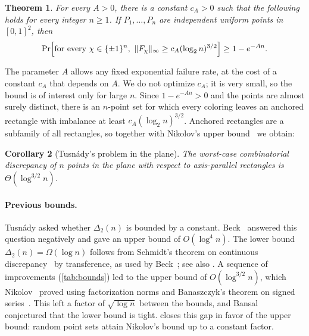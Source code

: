 \documentclass[11pt,letterpaper]{article}
\newtheorem{theorem}{Theorem}[section]
\newtheorem{corollary}[theorem]{Corollary}
\newcommand{\1}{\mathbf{1}}
\newcommand{\Fnorm}[1]{\lVert #1\rVert_\infty}
\newcommand{\pmone}{\{\pm1\}}
\begin{document}
\begin{theorem}\label{thm:main}
For every $A>0$, there is a constant $c_A>0$ such that the following holds for every integer $n\ge1$. If $P_1,\dots,P_n$ are independent uniform points in $[0,1]^2$, then
\[
\Pr\Bigl[\text{for every }\chi\in\pmone^n,\ \Fnorm{F_\chi}\ge c_A(\log_2n)^{3/2}\Bigr]\ge1-e^{-An}.
\]
\end{theorem}

The parameter $A$ allows any fixed exponential failure rate, at the cost of a constant $c_A$ that depends on $A$. We do not optimize $c_A$; it is very small, so the bound is of interest only for large $n$. Since $1-e^{-An}>0$ and the points are almost surely distinct, there is an $n$-point set for which every coloring leaves an anchored rectangle with imbalance at least $c_A(\log_2n)^{3/2}$. Anchored rectangles are a subfamily of all rectangles, so together with Nikolov's upper bound~\cite{Nik17} we obtain:

\begin{corollary}[Tusn\'ady's problem in the plane]\label{cor:main}
The worst-case combinatorial discrepancy of $n$ points in the plane with respect to axis-parallel rectangles is $\Theta(\log^{3/2}n)$.
\end{corollary}

\paragraph{Previous bounds.}
Tusn\'ady asked whether $\Delta_2(n)$ is bounded by a constant. Beck~\cite{Bec81} answered this question negatively and gave an upper bound of $O(\log^4n)$. The lower bound $\Delta_2(n)=\Omega(\log n)$ follows from Schmidt's theorem on continuous discrepancy~\cite{Sch72} by transference, as used by Beck~\cite{Bec81}; see also \cite{Mat99,ABN18}. A sequence of improvements (\cref{tab:bounds}) led to the upper bound of $O(\log^{3/2}n)$, which Nikolov~\cite{Nik17} proved using factorization norms and Banaszczyk's theorem on signed series~\cite{Ban12}. This left a factor of $\sqrt{\log n}$ between the bounds, and Bansal~\cite{Ban22} conjectured that the lower bound is tight.  closes this gap in favor of the upper bound: random point sets attain Nikolov's bound up to a constant factor.
\end{document}
